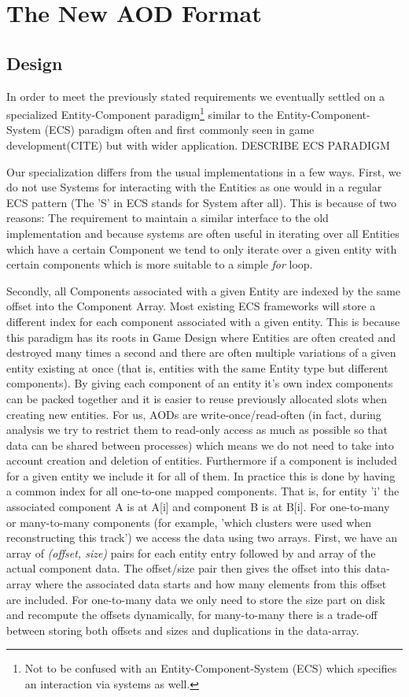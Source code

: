 \documentclass[a4paper]{report}
\begin{document}
\chapter{The New AOD Format}

\section{Design}
In order to meet the previously stated requirements we eventually settled on a specialized Entity-Component paradigm\footnote{Not to be confused with an Entity-Component-System (ECS) which specifies an interaction via systems as well.}
similar to the Entity-Component-System (ECS) paradigm often and first commonly seen in game development(CITE) but with wider application. DESCRIBE ECS PARADIGM
\par Our specialization differs from the usual implementations in a few ways. First, we do not use Systems for interacting with the Entities as one would in a regular ECS pattern (The 'S' in ECS stands for System after all).
This is because of two reasons: The requirement to maintain a similar interface to the old implementation and because systems are often useful in iterating over all Entities which have a certain Component we tend
to only iterate over a given entity with certain components which is more suitable to a simple {\em for} loop.
\par Secondly, all Components associated with a given Entity are indexed by the same offset into the Component Array. Most existing ECS frameworks will store a different index for each component associated with a given entity.
This is because this paradigm has its roots in Game Design where Entities are often created and destroyed many times a second and there are often multiple variations of a given entity existing at once (that is, entities with the same Entity type but different components).
By giving each component of an entity it's own index components can be packed together and it is easier to reuse previously allocated slots when creating new entities.
 For us, AODs are write-once/read-often (in fact, during analysis we try to restrict them to read-only access as much as possible so that data can be shared between processes)
 which means we do not need to take into account creation and deletion of entities. Furthermore if a component is included for a given entity we include it for all of them. In practice this is done by having a common index for
 all one-to-one mapped components. That is, for entity 'i' the associated component A is at A[i] and component B is at B[i]. For one-to-many or many-to-many components (for example, 'which clusters were used when reconstructing this track') we access
 the data using two arrays. First, we have an array of {\em (offset, size)} pairs for each entity entry followed by and array of the actual component data. The offset/size pair then gives the offset into this data-array where the associated data starts and how many elements from this offset are included.
 For one-to-many data we only need to store the size part on disk and recompute the offsets dynamically, for many-to-many there is a trade-off between storing both offsets and sizes and duplications in the data-array.
\end{document}
